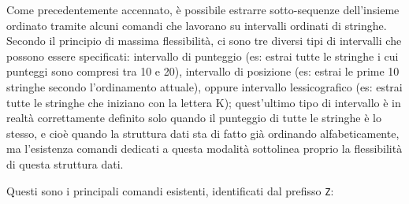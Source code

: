 Come precedentemente accennato, è possibile estrarre sotto-sequenze dell'insieme ordinato tramite
alcuni comandi che lavorano su intervalli ordinati di stringhe. Secondo il principio di massima
flessibilità, ci sono tre diversi tipi di intervalli che possono essere specificati: intervallo di
punteggio (es: estrai tutte le stringhe i cui punteggi sono compresi tra 10 e 20), intervallo di
posizione (es: estrai le prime 10 stringhe secondo l'ordinamento attuale), oppure intervallo
lessicografico (es: estrai tutte le stringhe che iniziano con la lettera K); quest'ultimo tipo di
intervallo è in realtà correttamente definito solo quando il punteggio di tutte le stringhe è lo
stesso, e cioè quando la struttura dati sta di fatto già ordinando alfabeticamente, ma l'esistenza
comandi dedicati a questa modalità sottolinea proprio la flessibilità di questa struttura dati.

Questi sono i principali comandi esistenti, identificati dal prefisso \verb|Z|:

